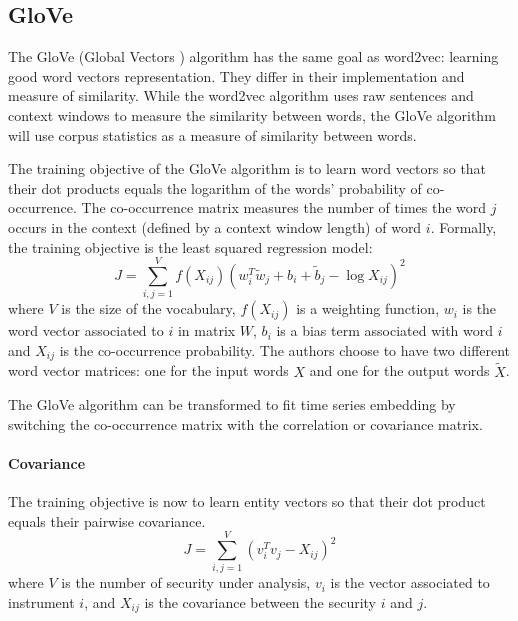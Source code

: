 \documentclass[a4paper, 11pt]{article}
\begin{document}
\subsection{GloVe}

The GloVe (Global Vectors \cite{pennington2014glove}) algorithm has the same goal as word2vec: learning good word vectors representation. They differ in their implementation and measure of similarity. While the word2vec algorithm uses raw sentences and context windows to measure the similarity between words, the GloVe algorithm will use corpus statistics as a measure of similarity between words.

The training objective of the GloVe algorithm is to learn word vectors so that their dot products equals the logarithm of the words' probability of co-occurrence. The co-occurrence matrix measures the number of times the word \(j\) occurs in the context (defined by a context window length) of word \(i\). Formally, the training objective is the least squared regression model:
\begin{equation}
J = \sum_{i,j=1}^{V} f(X_{ij})(w_i^T \tilde{w}_j + b_i + \tilde{b}_j - \log X_{ij})^2
\end{equation}
where \(V\) is the size of the vocabulary, \(f(X_{ij})\) is a weighting function, \(w_i\) is the word vector associated to \(i\) in matrix \(W\), \(b_i\) is a bias term associated with word \(i\) and \(X_{ij}\) is the co-occurrence probability. The authors choose to have two different word vector matrices: one for the input words \(X\) and one for the output words \(\tilde{X}\).

The GloVe algorithm can be transformed to fit time series embedding by switching the co-occurrence matrix with the correlation or covariance matrix.  

\paragraph{Covariance}
The training objective is now to learn entity vectors so that their dot product equals their pairwise covariance.
\begin{equation}
J = \sum_{i,j=1}^{V} (v_i^T v_j - X_{ij})^2
\end{equation}
where \(V\) is the number of security under analysis, \(v_i\) is the vector associated to instrument \(i\), and \(X_{ij}\) is the covariance between the security \(i\) and \(j\).
\end{document}
